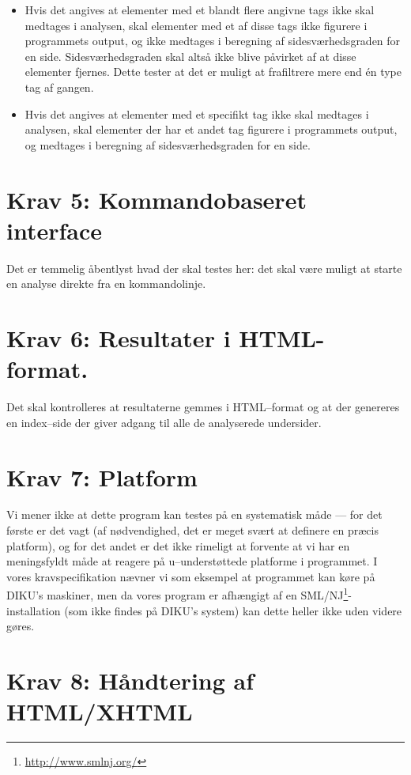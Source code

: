 \documentclass[a4paper,oneside,article]{memoir}
\begin{document}
\begin{itemize}
\item Hvis det angives at elementer med et blandt flere angivne tags
  ikke skal medtages i analysen, skal elementer med et af disse tags
  ikke figurere i programmets output, og ikke medtages i beregning af
  sidesværhedsgraden for en side. Sidesværhedsgraden skal altså ikke
  blive påvirket af at disse elementer fjernes. Dette tester at det er
  muligt at frafiltrere mere end én type tag af gangen.
\item Hvis det angives at elementer med et specifikt tag ikke skal
  medtages i analysen, skal elementer der har et andet tag figurere i
  programmets output, og medtages i beregning af sidesværhedsgraden
  for en side.
\end{itemize}

\section{Krav 5: Kommandobaseret interface}
Det er temmelig åbentlyst hvad der skal testes her: det skal være
muligt at starte en analyse direkte fra en kommandolinje.

\section{Krav 6: Resultater i HTML-format.}
Det skal kontrolleres at resultaterne gemmes i HTML--format og at der
genereres en index--side der giver adgang til alle de analyserede
undersider.

\section{Krav 7: Platform}

Vi mener ikke at dette program kan testes på en systematisk måde ---
for det første er det vagt (af nødvendighed, det er meget svært at
definere en præcis platform), og for det andet er det ikke rimeligt at
forvente at vi har en meningsfyldt måde at reagere på u--understøttede
platforme i programmet. I vores kravspecifikation nævner vi som
eksempel at programmet kan køre på DIKU's maskiner, men da vores
program er afhængigt af en
SML/NJ\footnote{\url{http://www.smlnj.org/}}-installation (som ikke
findes på DIKU's system) kan dette heller ikke uden videre gøres.

\section{Krav 8: Håndtering af HTML/XHTML}
\end{document}
